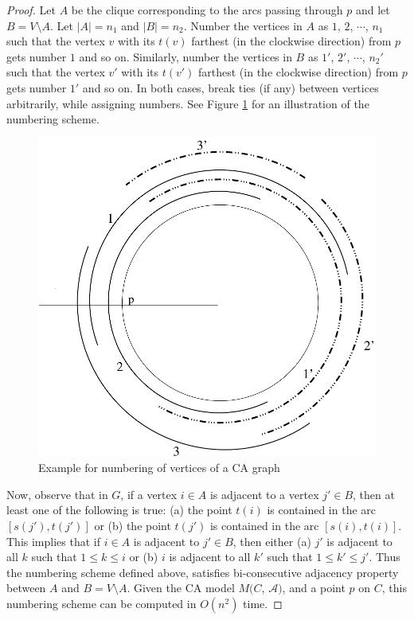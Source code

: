 \begin{proof}
 Let $A$ be the clique corresponding to the arcs passing through $p$ and let $B = V \setminus A$. Let $|A| = n_1$ and $|B| = n_2$. Number the vertices in $A$ as $1$, $2$, $\cdots$, $n_1$ such that the vertex $v$ with its $t(v)$ farthest (in the clockwise direction) from $p$  gets number $1$ and so on. Similarly, number the vertices in $B$ as  $1'$, $2'$, $\cdots$, $n_2'$ such that the vertex $v'$ with its $t(v')$ farthest (in the clockwise direction) from $p$  gets number $1'$ and so on. In both cases, break ties (if any) between vertices arbitrarily, while assigning numbers. See Figure \ref{Fig1} for an illustration of the numbering scheme.
\begin{figure} 
\begin{center}
\includegraphics[scale=0.4]{gfx/arcs_num}
\caption{Example for numbering of vertices of a CA graph}
\label{Fig1}
\end{center}
\end{figure}
Now, observe that in $G$, if a vertex $i \in A$ is adjacent to a vertex $j' \in B$, then at least one of the following is true: 
(a) the point $t(i)$ is contained in the arc $[s(j'), t(j')]$ or (b) the point $t(j')$ is contained in the arc $[s(i), t(i)]$. This implies that if $i \in A$ is adjacent to $j' \in B$, then  either (a) $j'$ is adjacent to all $k$ such that $1\le k \le i$  or (b) $i$ is adjacent to all $k'$ such that $1\le k' \le j'$. Thus the numbering scheme defined above, satisfies bi-consecutive adjacency property between $A$ and $B=V \setminus A$. Given the CA model $M(C$, $\mathcal{A})$, and a point $p$ on $C$, this numbering scheme can be computed in $O(n^2)$ time.
\end{proof}
